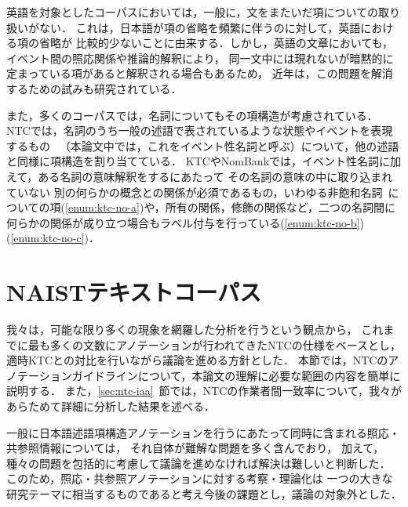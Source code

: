 \documentclass[japanese]{jnlp_1.4}
\begin{document}
英語を対象としたコーパスにおいては，一般に，文をまたいだ項についての取り扱いがない．
これは，日本語が項の省略を頻繁に伴うのに対して，英語における項の省略が
比較的少ないことに由来する．しかし，英語の文章においても，イベント間の照応関係や推論的解釈により，
同一文中には現れないが暗黙的に定まっている項があると解釈される場合もあるため，
近年は，この問題を解消するための試みも研究されている\cite{laparra2013impar,frankpredicate,Silberer:2012:CIR:2387636.2387638}．

また，多くのコーパスでは，名詞についてもその項構造が考慮されている．
NTCでは，名詞のうち一般の述語で表されているような状態やイベントを表現するもの
~\cite{noun2008}（本論文中では，これをイベント性名詞と呼ぶ）について，他の述語と同様に項構造を割り当てている．
KTCやNomBankでは，イベント性名詞に加えて，ある名詞の意味解釈をするにあたって
その名詞の意味の中に取り込まれていない
別の何らかの概念との関係が必須であるもの，いわゆる非飽和名詞~\cite{nishiyama2003}についての項(\ref{enum:ktc-no-a})や，所有の関係，修飾の関係など，二つの名詞間に何らかの関係が成り立つ場合もラベル付与を行っている(\ref{enum:ktc-no-b})(\ref{enum:ktc-no-c})．


\section{NAISTテキストコーパス}
\label{sec:ntc}

我々は，可能な限り多くの現象を網羅した分析を行うという観点から，
これまでに最も多くの文数にアノテーションが行われてきたNTCの仕様をベースとし，
適時KTCとの対比を行いながら議論を進める方針とした．
本節では，NTCのアノテーションガイドラインについて，本論文の理解に必要な範囲の内容を簡単に説明する．
また，\ref{sec:ntc-iaa}~節では，NTCの作業者間一致率について，我々があらためて詳細に分析した結果を述べる．

一般に日本語述語項構造アノテーションを行うにあたって同時に含まれる照応・共参照情報については，
それ自体が難解な問題を多く含んでおり，
加えて，種々の問題を包括的に考慮して議論を進めなければ解決は難しいと判断した．
このため，照応・共参照アノテーションに対する考察・理論化は
一つの大きな研究テーマに相当するものであると考え今後の課題とし，議論の対象外とした．
\end{document}
